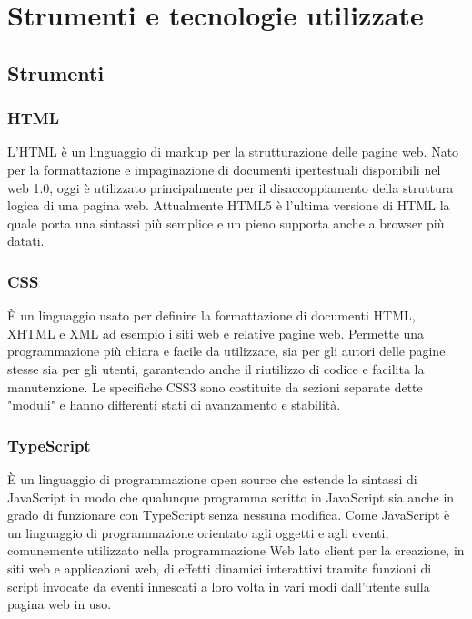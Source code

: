 \section{Strumenti e tecnologie utilizzate}
\subsection{Strumenti}
\subsubsection*{HTML}
L'HTML è un linguaggio di markup per la strutturazione delle pagine web. Nato per la formattazione e impaginazione di documenti ipertestuali disponibili nel web 1.0, oggi è utilizzato principalmente per il disaccoppiamento della struttura logica di una pagina web. Attualmente HTML5 è l'ultima versione di HTML la quale porta una sintassi più semplice e un pieno supporta anche a browser più datati.

\subsubsection*{CSS}
È un linguaggio usato per definire la formattazione di documenti HTML, XHTML e XML ad esempio i siti web e relative pagine web. Permette una programmazione più chiara e facile da utilizzare, sia per gli autori delle pagine stesse sia per gli utenti, garantendo anche il riutilizzo di codice e facilita la manutenzione. Le specifiche CSS3 sono costituite da sezioni separate dette "moduli" e hanno differenti stati di avanzamento e stabilità.

\subsubsection*{TypeScript}
È un linguaggio di programmazione open source che estende la sintassi di JavaScript in modo che qualunque programma scritto in JavaScript sia anche in grado di funzionare con TypeScript senza nessuna modifica. Come JavaScript è un linguaggio di programmazione orientato agli oggetti e agli eventi, comunemente utilizzato nella programmazione Web lato client per la creazione, in siti web e applicazioni web, di effetti dinamici interattivi tramite funzioni di script invocate da eventi innescati a loro volta in vari modi dall'utente sulla pagina web in uso.

